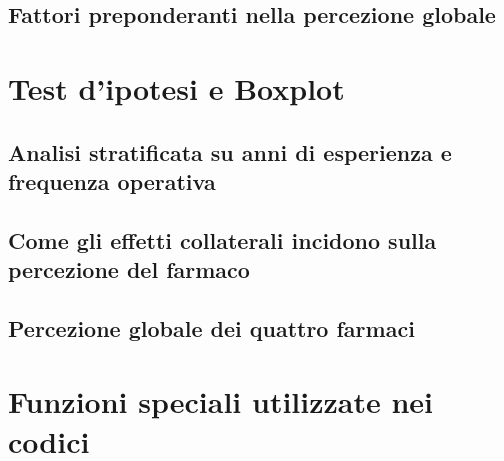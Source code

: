     \subsection*{Fattori preponderanti nella percezione globale}
    \label{code:satisfaction}
    
    \newpage

\newpage

\section{Test d'ipotesi e Boxplot}

    \subsection*{Analisi stratificata su anni di esperienza e frequenza operativa}
    \label{code:quality-strati}
    
    \newpage

    \subsection*{Come gli effetti collaterali incidono sulla percezione del farmaco}
    \label{code:adverse-effects-perception}
    
    \newpage

    \subsection*{Percezione globale dei quattro farmaci}
    \label{code:quality-global}
    
    \newpage

\newpage

\section{Funzioni speciali utilizzate nei codici}
\label{code:subroutines}

    
    \bigskip

    
    \bigskip

    
    \bigskip
